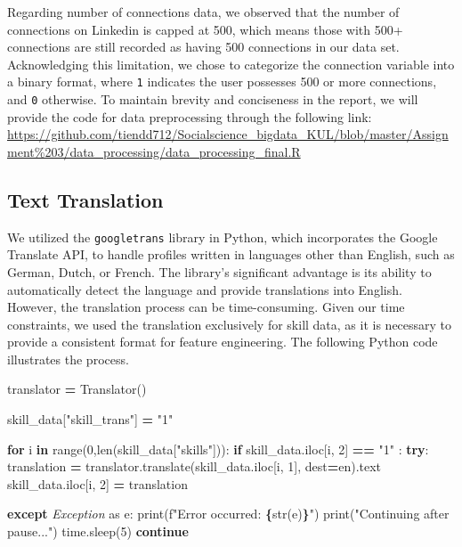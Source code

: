 \documentclass[11pt,]{article}
\newenvironment{Shaded}{\begin{snugshade}}{\end{snugshade}}
\newcommand{\BuiltInTok}[1]{#1}
\newcommand{\ControlFlowTok}[1]{\textcolor[rgb]{0.13,0.29,0.53}{\textbf{#1}}}
\newcommand{\DecValTok}[1]{\textcolor[rgb]{0.00,0.00,0.81}{#1}}
\newcommand{\ImportTok}[1]{#1}
\newcommand{\KeywordTok}[1]{\textcolor[rgb]{0.13,0.29,0.53}{\textbf{#1}}}
\newcommand{\NormalTok}[1]{#1}
\newcommand{\OperatorTok}[1]{\textcolor[rgb]{0.81,0.36,0.00}{\textbf{#1}}}
\newcommand{\PreprocessorTok}[1]{\textcolor[rgb]{0.56,0.35,0.01}{\textit{#1}}}
\newcommand{\SpecialCharTok}[1]{\textcolor[rgb]{0.81,0.36,0.00}{\textbf{#1}}}
\newcommand{\SpecialStringTok}[1]{\textcolor[rgb]{0.31,0.60,0.02}{#1}}
\newcommand{\StringTok}[1]{\textcolor[rgb]{0.31,0.60,0.02}{#1}}
\begin{document}
Regarding number of connections data, we observed that the number of
connections on Linkedin is capped at 500, which means those with 500+
connections are still recorded as having 500 connections in our data
set. Acknowledging this limitation, we chose to categorize the
connection variable into a binary format, where \texttt{1} indicates the
user possesses 500 or more connections, and \texttt{0} otherwise. To
maintain brevity and conciseness in the report, we will provide the code
for data preprocessing through the following link:
\url{https://github.com/tiendd712/Socialscience_bigdata_KUL/blob/master/Assignment\%203/data_processing/data_processing_final.R}

\hypertarget{text-translation}{%
\subsection{Text Translation}\label{text-translation}}

We utilized the \texttt{googletrans} library in Python, which
incorporates the Google Translate API, to handle profiles written in
languages other than English, such as German, Dutch, or French. The
library's significant advantage is its ability to automatically detect
the language and provide translations into English. However, the
translation process can be time-consuming. Given our time constraints,
we used the translation exclusively for skill data, as it is necessary
to provide a consistent format for feature engineering. The following
Python code illustrates the process.

\begin{Shaded}
\begin{Highlighting}[]
\NormalTok{translator }\OperatorTok{=}\NormalTok{ Translator()}

\NormalTok{skill\_data[}\StringTok{"skill\_trans"}\NormalTok{] }\OperatorTok{=} \StringTok{"1"}


\ControlFlowTok{for}\NormalTok{ i }\KeywordTok{in} \BuiltInTok{range}\NormalTok{(}\DecValTok{0}\NormalTok{,}\BuiltInTok{len}\NormalTok{(skill\_data[}\StringTok{"skills"}\NormalTok{])):}
  \ControlFlowTok{if}\NormalTok{ skill\_data.iloc[i, }\DecValTok{2}\NormalTok{] }\OperatorTok{==} \StringTok{"1"}\NormalTok{ :}
    \ControlFlowTok{try}\NormalTok{:}
\NormalTok{      translation }\OperatorTok{=}\NormalTok{ translator.translate(skill\_data.iloc[i, }\DecValTok{1}\NormalTok{], dest}\OperatorTok{=}\StringTok{\textquotesingle{}en\textquotesingle{}}\NormalTok{).text}
\NormalTok{      skill\_data.iloc[i, }\DecValTok{2}\NormalTok{] }\OperatorTok{=}\NormalTok{ translation}
      

    \ControlFlowTok{except} \PreprocessorTok{Exception} \ImportTok{as}\NormalTok{ e:}
      \BuiltInTok{print}\NormalTok{(}\SpecialStringTok{f"Error occurred: }\SpecialCharTok{\{}\BuiltInTok{str}\NormalTok{(e)}\SpecialCharTok{\}}\SpecialStringTok{"}\NormalTok{)}
      \BuiltInTok{print}\NormalTok{(}\StringTok{"Continuing after pause..."}\NormalTok{)}
\NormalTok{      time.sleep(}\DecValTok{5}\NormalTok{)}
      \ControlFlowTok{continue}
\end{Highlighting}
\end{Shaded}
\end{document}
